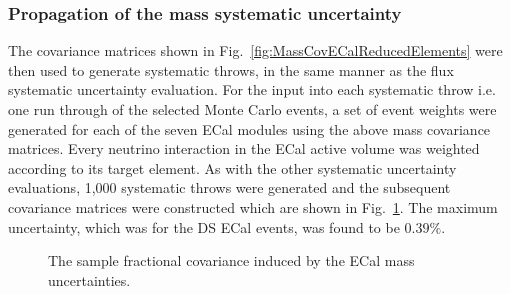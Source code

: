 \subsubsection{Propagation of the mass systematic uncertainty}
\label{subsubsec:ECalMassSystematicPropagation}
The covariance matrices shown in Fig.~\ref{fig:MassCovECalReducedElements} were then used to generate systematic throws, in the same manner as the flux systematic uncertainty evaluation.  For the input into each systematic throw i.e. one run through of the selected Monte Carlo events, a set of event weights were generated for each of the seven ECal modules using the above mass covariance matrices.  Every neutrino interaction in the ECal active volume was weighted according to its target element.  As with the other systematic uncertainty evaluations, 1,000 systematic throws were generated and the subsequent covariance matrices were constructed which are shown in Fig.~\ref{fig:ECalMassCovarianceMatrices}.  The maximum uncertainty, which was for the DS ECal events, was found to be $0.39\%$. 
\begin{figure}%
  \centering
  \caption{The sample fractional covariance induced by the ECal mass uncertainties.}
  \label{fig:ECalMassCovarianceMatrices}
\end{figure}
